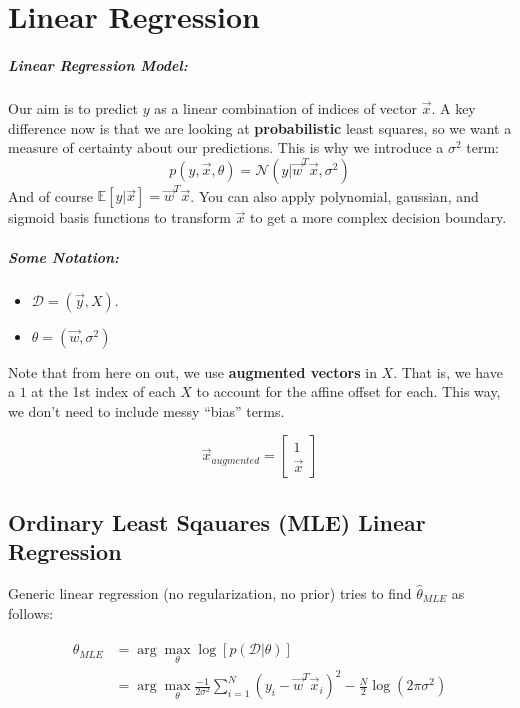 \documentclass[a4paper,12pt]{report}
\begin{document}
\chapter{Linear Regression}

\paragraph{Linear Regression Model: } Our aim is to predict $y$ as a linear combination of indices of vector $\vec x$. A key difference now is that we are looking at \textbf{probabilistic} least squares, so we want a measure of certainty about our predictions. This is why we introduce a $\sigma^2$ term:
\begin{equation}
p(y, \vec x, \theta) = \mathcal N(y | \vec w^T\vec x, \sigma^2)
\end{equation}
And of course $\mathbb E[y|\vec x] = \vec w^T \vec x$. You can also apply polynomial, gaussian, and sigmoid basis functions to transform $\vec x$ to get a more complex decision boundary.

\paragraph{Some Notation: } 
\begin{itemize}
\item $\mathcal D = (\vec y, X)$.
\item $\theta = (\vec w, \sigma^2)$
\end{itemize}
Note that from here on out, we use \textbf{augmented vectors} in $X$. That is, we have a $1$ at the 1st index of each $X$ to account for the affine offset for each. This way, we don't need to include messy ``bias'' terms.

$$\vec x_{augmented} = \begin{bmatrix} 1\\\vec x \end{bmatrix}$$




\section{Ordinary Least Sqauares (MLE) Linear Regression}

Generic linear regression (no regularization, no prior) tries to find $\hat \theta_{MLE}$ as follows: 

\begin{equation}
\begin{split}
\hat \theta_{MLE} &= \arg\max_{\theta} \log[p(\mathcal D | \theta)] \\
&= \arg\max_{\theta} \frac{-1}{2\sigma^2} \sum_{i=1}^{N} (y_i - \vec w^T \vec x_i)^2 - \frac{N}{2} \log(2\pi\sigma^2)
\end{split}
\end{equation}
\end{document}
